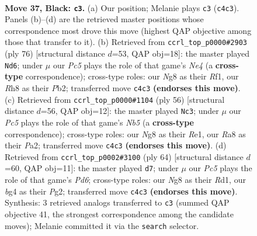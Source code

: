 \documentclass[11pt]{article}
\begin{document}
\clearpage

\begin{figure}[p]\centering
\begin{subfigure}{0.46\textwidth}\centering
\resizebox{\linewidth}{!}{%
\newchessgame
\chessboard[
  setfen={r5nr/p6p/1b3k2/8/2p2BB1/PP5P/R1P3P1/1R5K b - - 3 37},
  showmover=false,
  pgfstyle=straightmove, color=movearrow, markmove={c4-c3}
]}
\caption{}
\end{subfigure}\hfill
\begin{subfigure}{0.46\textwidth}\centering
\resizebox{\linewidth}{!}{%
\newchessgame
\chessboard[
  setfen={7k/1pr3p1/p1b1B3/4pPp1/2P1N2b/8/1P4P1/5R1K w - - 1 39},
  showmover=false,
  pgfstyle=straightmove, color=movearrow, markmove={e4-d6}
]}
\caption{}
\end{subfigure}
\\[4pt]
\begin{subfigure}{0.46\textwidth}\centering
\resizebox{\linewidth}{!}{%
\newchessgame
\chessboard[
  setfen={r5k1/pp5p/2b2rp1/1N6/2P1p3/7P/PP4P1/3RR1K1 w - - 0 29},
  showmover=false,
  pgfstyle=straightmove, color=movearrow, markmove={b5-c3}
]}
\caption{}
\end{subfigure}\hfill
\begin{subfigure}{0.46\textwidth}\centering
\resizebox{\linewidth}{!}{%
\newchessgame
\chessboard[
  setfen={4r1k1/5ppp/p2P4/1prNb3/8/P2R3P/6P1/3R2K1 w - - 0 33},
  showmover=false,
  pgfstyle=straightmove, color=movearrow, markmove={d6-d7}
]}
\caption{}
\end{subfigure}
\caption{\textbf{Move 37, Black: \texttt{c3}.} (a) Our position; Melanie plays \texttt{c3} (\texttt{c4c3}). Panels (b)--(d) are the retrieved master positions whose correspondence most drove this move (highest QAP objective among those that transfer to it). (b) Retrieved from \texttt{ccrl\_top\_p0000\#2903} (ply 76) [structural distance $d$=53, QAP obj=18]: the master played \texttt{Nd6}; under $\mu$ our \emph{Pc5} plays the role of that game's \emph{Ne4} (a \textbf{cross-type} correspondence); cross-type roles: our \emph{N}g8 as their \emph{R}f1, our \emph{R}h8 as their \emph{P}b2; transferred move \texttt{c4c3} \textbf{(endorses this move)}. (c) Retrieved from \texttt{ccrl\_top\_p0000\#1104} (ply 56) [structural distance $d$=56, QAP obj=12]: the master played \texttt{Nc3}; under $\mu$ our \emph{Pc5} plays the role of that game's \emph{Nb5} (a \textbf{cross-type} correspondence); cross-type roles: our \emph{N}g8 as their \emph{R}e1, our \emph{R}a8 as their \emph{P}a2; transferred move \texttt{c4c3} \textbf{(endorses this move)}. (d) Retrieved from \texttt{ccrl\_top\_p0002\#3100} (ply 64) [structural distance $d$=60, QAP obj=11]: the master played \texttt{d7}; under $\mu$ our \emph{Pc5} plays the role of that game's \emph{Pd6}; cross-type roles: our \emph{N}g8 as their \emph{R}d1, our \emph{b}g4 as their \emph{P}g2; transferred move \texttt{c4c3} \textbf{(endorses this move)}. Synthesis: 3 retrieved analogs transferred to \texttt{c3} (summed QAP objective 41, the strongest correspondence among the candidate moves); Melanie committed it via the \texttt{search} selector.}
\label{fig:thought-m73}
\end{figure}
\end{document}
